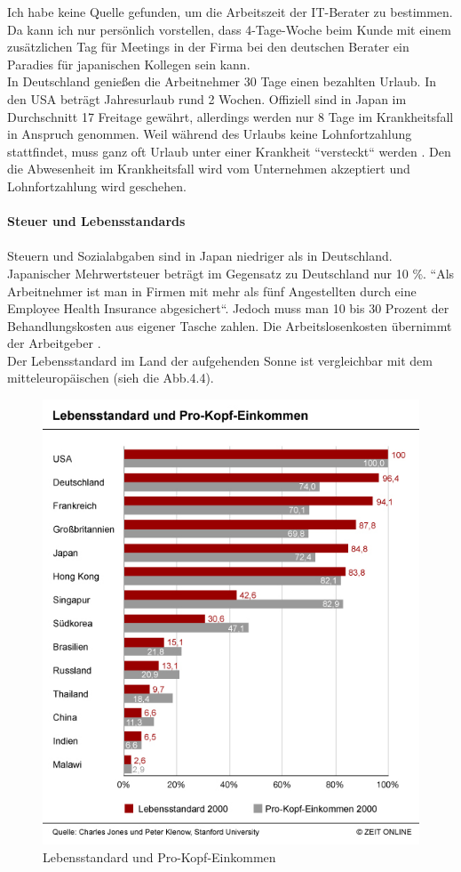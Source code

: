 	Ich habe keine Quelle gefunden, um die Arbeitszeit der IT-Berater zu bestimmen. Da kann ich nur persönlich vorstellen, dass 4-Tage-Woche beim Kunde mit einem zusätzlichen Tag für Meetings in der Firma bei den deutschen Berater ein Paradies für japanischen Kollegen sein kann. \\
	In Deutschland genießen die Arbeitnehmer 30 Tage einen bezahlten Urlaub. In den USA beträgt Jahresurlaub rund 2 Wochen. Offiziell sind in Japan im Durchschnitt 17 Freitage gewährt, allerdings werden nur 8 Tage im Krankheitsfall in Anspruch genommen. Weil während des Urlaubs keine Lohnfortzahlung stattfindet, muss ganz oft Urlaub unter einer Krankheit ``versteckt`` werden \cite{JPArbeitSozKultur}. Den die Abwesenheit im Krankheitsfall wird vom Unternehmen akzeptiert und Lohnfortzahlung wird geschehen.\\
	\\
		\textbf{Steuer und Lebensstandards}\\
		\\
		Steuern und Sozialabgaben sind in Japan niedriger als in Deutschland. Japanischer Mehrwertsteuer beträgt im Gegensatz zu Deutschland nur 10 \%.
		``Als Arbeitnehmer ist man in Firmen mit mehr als fünf Angestellten durch eine Employee Health Insurance abgesichert``. Jedoch muss man 10 bis 30 Prozent der Behandlungskosten aus eigener Tasche zahlen. Die Arbeitslosenkosten übernimmt der Arbeitgeber \cite{ArbZeitJP}.
		\\Der Lebensstandard im Land der aufgehenden Sonne ist vergleichbar mit dem mitteleuropäischen (sieh die Abb.4.4).
		\begin{figure}[ht]
		\centering
		\includegraphics[width=0.7\linewidth]{./images/Lebensstandard-Pro-Kopf-Einkommen}
		\caption{Lebensstandard und Pro-Kopf-Einkommen \cite{LebensStd}}
		\label{fig:LebStdProKEink}
		\end{figure}\\
